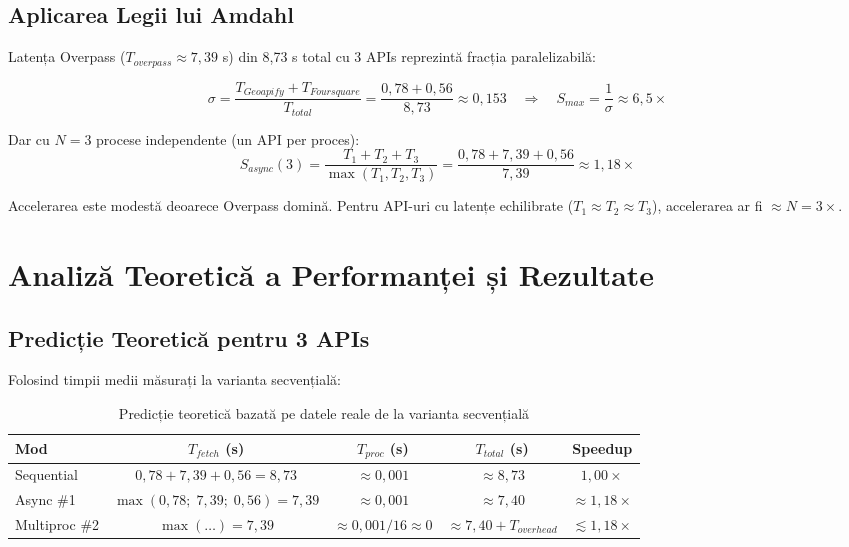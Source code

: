 \documentclass[12pt,a4paper]{article}
\newcommand{\thead}[1]{\cellcolor{tblh}\color{white}\textbf{#1}}
\begin{document}
\subsection{Aplicarea Legii lui Amdahl}

Latența Overpass ($T_{overpass} \approx 7{,}39$ s) din 8{,}73 s total cu 3 APIs reprezintă fracția paralelizabilă:

\[
\sigma = \frac{T_{Geoapify} + T_{Foursquare}}{T_{total}} = \frac{0{,}78 + 0{,}56}{8{,}73} \approx 0{,}153
\quad\Rightarrow\quad
S_{max} = \frac{1}{\sigma} \approx 6{,}5\times
\]

Dar cu $N=3$ procese independente (un API per proces):
\[
S_{async}(3) = \frac{T_1 + T_2 + T_3}{\max(T_1, T_2, T_3)}
            = \frac{0{,}78 + 7{,}39 + 0{,}56}{7{,}39} \approx 1{,}18\times
\]

Accelerarea este modestă deoarece Overpass domină. Pentru API-uri cu latențe echilibrate ($T_1 \approx T_2 \approx T_3$), accelerarea ar fi $\approx N = 3\times$.

\section{Analiză Teoretică a Performanței și Rezultate}

\subsection{Predicție Teoretică pentru 3 APIs}

Folosind timpii medii măsurați la varianta secvențială:

\begin{table}[H]
\centering
\begin{tabular}{lcccc}
\toprule
\thead{Mod} & \thead{$T_{fetch}$ (s)} & \thead{$T_{proc}$ (s)} & \thead{$T_{total}$ (s)} & \thead{Speedup} \\
\midrule
Sequential      & $0{,}78 + 7{,}39 + 0{,}56 = 8{,}73$ & $\approx 0{,}001$ & $\approx 8{,}73$ & $1{,}00\times$ \\
Async \#1       & $\max(0{,}78;\; 7{,}39;\; 0{,}56) = 7{,}39$ & $\approx 0{,}001$ & $\approx 7{,}40$ & $\approx 1{,}18\times$ \\
Multiproc \#2   & $\max(\ldots) = 7{,}39$ & $\approx 0{,}001/16 \approx 0$ & $\approx 7{,}40 + T_{overhead}$ & $\lesssim 1{,}18\times$ \\
\bottomrule
\end{tabular}
\caption{Predicție teoretică bazată pe datele reale de la varianta secvențială}
\end{table}
\end{document}
